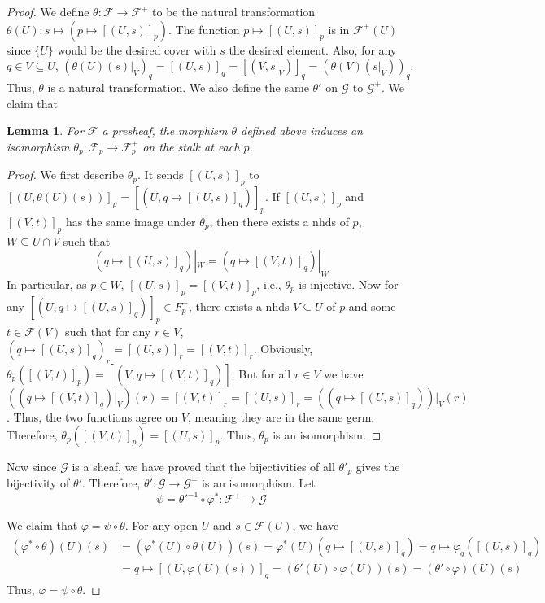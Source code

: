 \documentclass[12pt]{article}
\newtheorem{lemma}{Lemma}[subsection]
\theoremstyle{remark}
\begin{document}
\begin{proof}
	We define $\theta:\mathscr F\to\mathscr F^+$ to be the natural transformation $\theta(U):s\mapsto (p\mapsto [(U, s)]_p)$. The function $p\mapsto [(U, s)]_p$ is in $\mathscr F^+(U)$ since $\{U\}$ would be the desired cover with $s$ the desired element. Also, for any $q\in V\subseteq U$, $\left(\theta (U)(s)|_V\right)_q=[(U, s)]_q=[(V, s|_V)]_q=\left(\theta(V)(s|_V)\right)_q$. Thus, $\theta$ is a natural transformation. We also define the same $\theta'$ on $\mathscr G$ to $\mathscr G^+$. We claim that
	\begin{lemma}\label{l122}
	For $\mathscr F$ a presheaf, the morphism $\theta$ defined above induces an isomorphism $\theta_p:\mathscr F_p\to \mathscr F_p^+$ on the stalk at each $p$.
	\end{lemma}
	\begin{proof}
	We first describe $\theta_p$. It sends $[(U, s)]_p$ to $[(U, \theta(U)(s))]_p=[(U, q\mapsto [(U, s)]_q)]_p$. If $[(U, s)]_p$ and $[(V, t)]_p$ has the same image under $\theta_p$, then there exists a nhds of $p$, $W\subseteq U\cap V$ such that
	\[(q\mapsto [(U, s)]_q)|_W=(q\mapsto [(V, t)]_q)|_W\]
	In particular, as $p\in W$, $[(U, s)]_p=[(V, t)]_p$, i.e., $\theta_p$ is injective. Now for any $[(U, q\mapsto [(U, s)]_q)]_p\in F_p^+$, there exists a nhds $V\subseteq U$ of $p$ and some $t\in \mathcal F(V)$ such that for any $r\in V$,$(q\mapsto [(U, s)]_q)_r=[(U, s)]_r=[(V, t)]_r$. Obviously, $\theta_p([(V, t)]_p)=[(V, q\mapsto [(V, t)]_q)]$. But for all $r\in V$ we have $\left((q\mapsto [(V, t)]_q)|_V\right)(r)=[(V, t)]_r=[(U, s)]_r=\left((q\mapsto [(U, s)]_q)\right)|_V(r)$. Thus, the two functions agree on $V$, meaning they are in the same germ. Therefore, $\theta_p([(V, t)]_p)=[(U, s)]_p$. Thus, $\theta_p$ is an isomorphism.
	\end{proof}
	
	Now since $\mathscr G$ is a sheaf, we have proved that the bijectivities of all $\theta'_p$ gives the bijectivity of $\theta'$. Therefore, $\theta':\mathscr G\to\mathscr G^+$ is an isomorphism. Let
	\[\psi=\theta'^{-1}\circ \varphi^*:\mathscr F^+\to\mathscr G\]
	
	We claim that $\varphi=\psi\circ \theta$. For any open $U$ and $s\in\mathscr F(U)$, we have
	\begin{align*}
	(\varphi^*\circ\theta)(U)(s)&=(\varphi^*(U)\circ\theta(U))(s)=\varphi^*(U)(q\mapsto[(U, s)]_q)=q\mapsto\varphi_q([(U, s)]_q)\\
	&=q\mapsto[(U, \varphi(U)(s))]_q=(\theta'(U)\circ\varphi(U))(s)=(\theta'\circ\varphi)(U)(s)
	\end{align*}
	Thus, $\varphi=\psi\circ\theta$.
	

\end{proof}
\end{document}
